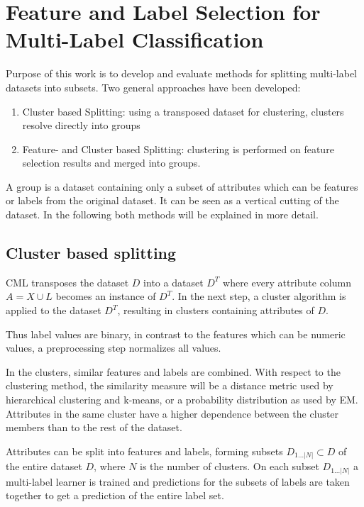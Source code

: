 \chapter{Feature and Label Selection for Multi-Label Classification}
\label{chapter:main}

	Purpose of this work is to develop and evaluate methods for splitting multi-label datasets into subsets. Two general approaches have been developed:
	\begin{enumerate}
		\item{Cluster based Splitting: using a transposed dataset for clustering, clusters resolve directly into groups}
		\item{Feature- and Cluster based Splitting: clustering is performed on feature selection results and merged into groups.}
	\end{enumerate}

	A group is a dataset containing only a subset of attributes which can be features or labels from the original dataset. It can be seen as a vertical cutting of the dataset. In the following both methods will be explained in more detail.

	\section{Cluster based splitting}
	\label{sec:CML}

		CML transposes the dataset $ D $ into a dataset $ D^T $ where every attribute column $ A = X \cup L $ becomes an instance of $ D^T $. In the next step, a cluster algorithm is applied to the dataset $ D^T $, resulting in clusters containing attributes of $ D $.
		
		Thus label values are binary, in contrast to the features which can be numeric values, a preprocessing step normalizes all values.

		In the clusters, similar features and labels are combined. With respect to the clustering method, the similarity measure will be a distance metric used by hierarchical clustering and k-means, or a probability distribution as used by EM. Attributes in the same cluster have a higher dependence between the cluster members than to the rest of the dataset.

		Attributes can be split into features and labels, forming subsets $ D_{1\hdots|N|} \subset D $ of the entire dataset $ D $, where $N$ is the number of clusters. On each subset $ D_{1\hdots|N|}$  a multi-label learner is trained and predictions for the subsets of labels are taken together to get a prediction of the entire label set.
		
